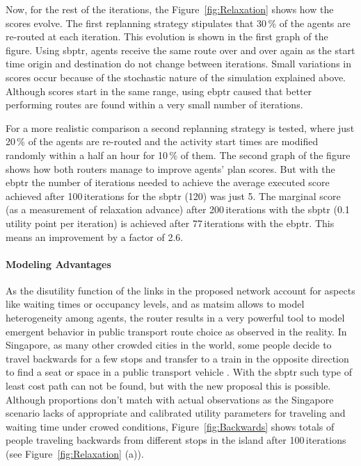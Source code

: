 Now, for the rest of the iterations, the Figure~\ref{fig:Relaxation} shows how the scores evolve. The first replanning strategy stipulates that 30\,\% of the agents are re-routed at each iteration. This evolution is shown in the first graph of the figure. Using \gls{sbptr}, agents receive the same route over and over again as the start time origin and destination do not change between iterations. Small variations in scores occur because of the stochastic nature of the simulation explained above. Although scores start in the same range, using \gls{ebptr} caused that better performing routes are found within a very small number of iterations.

For a more realistic comparison a second replanning strategy is tested, where just 20\,\% of the agents are re-routed and the activity start times are modified randomly within a half an hour for 10\,\% of them. The second graph of the figure shows how both routers manage to improve agents' plan scores. But with the \gls{ebptr} the number of iterations needed to achieve the average executed score achieved after 100\,iterations for the \gls{sbptr} (120) was just 5. The marginal score (as a measurement of relaxation advance) after 200\,iterations with the \gls{sbptr} (0.1\,utility point per iteration) is achieved after 77\,iterations with the \gls{ebptr}. This means an improvement by a factor of 2.6.

\paragraph{Modeling Advantages}

As the disutility function of the links in the proposed network account for aspects like waiting times or occupancy levels, and as \gls{matsim} allows to model heterogeneity among agents, the router results in a very powerful tool to model emergent behavior in public transport route choice as observed in the reality. In Singapore, as many other crowded cities in the world, some people decide to travel backwards for a few stops and transfer to a train in the opposite direction to find a seat or space in a public transport vehicle \cite{ChakirovErath_HKSTS_2011}. With the \gls{sbptr} such type of least cost path can not be found, but with the new proposal this is possible. Although proportions don't match with actual observations as the Singapore scenario lacks of appropriate and calibrated utility parameters for traveling and waiting time under crowed conditions, Figure~\ref{fig:Backwards} shows totals of people traveling backwards from different stops in the island after 100\,iterations (see Figure~\ref{fig:Relaxation} (a)).


